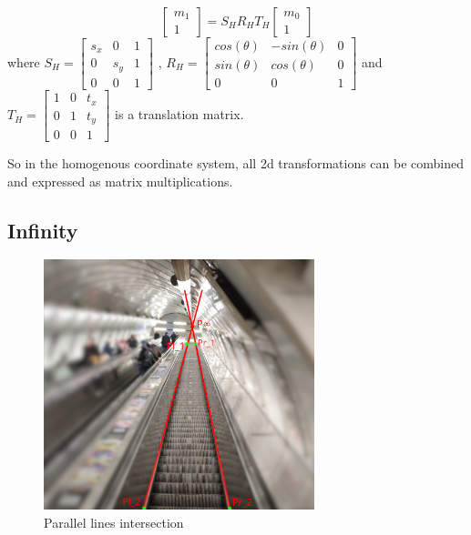 \begin{equation}
    \begin{bmatrix} m_1 \\ 1 \end{bmatrix} = 
    S_H R_H T_H
    \begin{bmatrix} m_0 \\ 1 \end{bmatrix}    
\end{equation}
where 
$S_H = \begin{bmatrix} s_x & 0 & 1\\ 0 & s_y & 1 \\ 0 & 0 & 1\end{bmatrix}$
, 
$R_H = \begin{bmatrix} cos(\theta) & -sin(\theta) & 0 \\ sin(\theta) & cos(\theta) & 0 \\ 0 & 0 & 1 \end{bmatrix}$
and
$T_H = \begin{bmatrix} 1 & 0 & t_x\\ 0 & 1 & t_y \\ 0 & 0 & 1 \end{bmatrix}$
is a translation matrix.

So in the homogenous coordinate system, all 2d transformations can be combined and expressed as matrix multiplications.

\subsection{Infinity}
\begin{figure}[h]
    \centering
    \includegraphics[width=0.7\textwidth]{graphics/parallel_intersection.jpg}
    \caption{Parallel lines intersection}
    \label{fig:intersection_parallel}
\end{figure}

